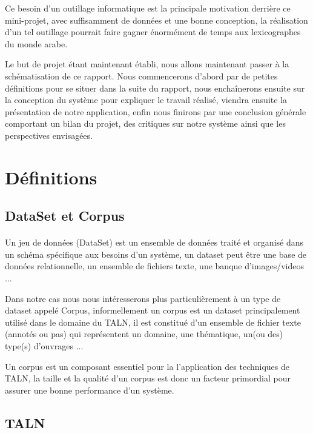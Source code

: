 \documentclass[]{report}
\begin{document}
		\par
		Ce besoin d'un outillage informatique est la principale motivation derrière ce mini-projet, avec suffisamment de données et une bonne conception, la réalisation d'un tel outillage pourrait faire gagner énormément de temps aux lexicographes du monde arabe.
		\par 
		Le but de projet étant maintenant établi, nous allons maintenant passer à la schématisation de ce rapport. Nous commencerons d'abord par de petites définitions pour se situer dans la suite du rapport, nous enchaînerons ensuite sur la conception du système pour expliquer le travail réalisé, viendra ensuite la présentation de notre application, enfin nous finirons par une conclusion générale comportant un bilan du projet, des critiques sur notre système ainsi que les perspectives envisagées.
	\newpage
	\section{Définitions}
		\subsection{DataSet et Corpus}
		\paragraph{}
		Un jeu de données (DataSet) est un ensemble de données traité et organisé dans un schéma spécifique aux besoins d'un système, un dataset peut être une base de données relationnelle, un ensemble de fichiers texte, une banque d'images/videos ...
		\par Dans notre cas nous nous intéresserons plus particulièrement à un type de dataset appelé Corpus, informellement un corpus est un dataset principalement utilisé dans le domaine du TALN, il est constitué d'un ensemble de fichier texte (annotés ou pas) qui représentent un domaine, une thématique, un(ou des) type(s) d'ouvrages ...
		\par Un corpus est un composant essentiel pour la l'application des techniques de TALN, la taille et la qualité d'un corpus est donc un facteur primordial pour assurer une bonne performance d'un système.
		\subsection{TALN}
\end{document}
